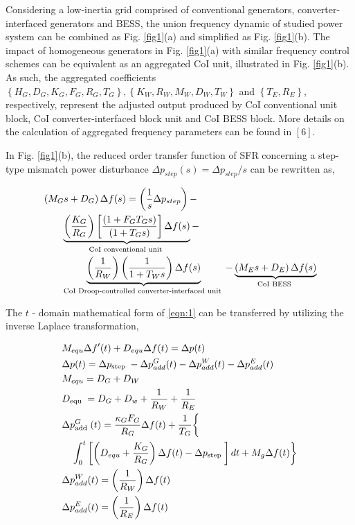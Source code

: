 \documentclass[lettersize,journal]{IEEEtran}
\begin{document}
Considering a low-inertia grid comprised of conventional generators, converter-interfaced generators and BESS, the union frequency dynamic of studied power system can be combined as Fig. \ref{fig1}(a) and simplified as Fig. \ref{fig1}(b). The impact of homogeneous generators in Fig. \ref{fig1}(a) with similar frequency control schemes can be equivalent as an aggregated $\mathrm{CoI}$ unit, illustrated in Fig. \ref{fig1}(b). As such, the aggregated coefficients $\left\{H_{G}, D_{G}, K_{G}, F_{G}, R_{G}, T_{G}\right\},\left\{K_{W}, R_{W}, M_{W}, D_{W}, T_{W}\right\}$ and $\left\{T_{E}, R_{E}\right\}$, respectively, represent the adjusted output produced by $\mathrm{CoI}$ conventional unit block, $\mathrm{CoI}$ converter-interfaced block unit and CoI BESS block. More details on the calculation of aggregated frequency parameters can be found in $[6]$. 

In Fig. \ref{fig1}(b), the reduced order transfer function of SFR concerning a step-type mismatch power disturbance $\Delta p_{{step }}(s)=\Delta p_{{step }} / s$ can be rewritten as,

\begin{align}\label{eqn:1}
& \left(M_{G} s+D_{G}\right) \Delta f(s)=\left(\frac{1}{s} \Delta p_{ {step }}\right)- \\
& \qquad\underbrace{\left(\frac{K_{G}}{ R_{G}}\right)\left[\frac{\left(1+F_{G} T_{G} s\right)}{\left(1+T_{G} s\right)}\right] \Delta f(s)}_{\text {CoI conventional unit }}- \notag\\
& \qquad\underbrace{\left(\frac{1}{R_{W}}\right)\left(\frac{1}{1+T_{W} s}\right) \Delta f(s)}_{\text {CoI Droop-controlled converter-interfaced unit }}-\underbrace{\left(M_{E} s+D_{E}\right) \Delta f(s)}_{\text {CoI BESS }} \notag
\end{align}

The $t$ - domain mathematical form of \eqref{eqn:1} can be transferred by utilizing the inverse Laplace transformation,

\begin{subequations}\label{eqn:2}
\begin{align}
& M_{e q u} \Delta f^{\prime}(t)+D_{e q u} \Delta f(t)=\Delta p(t) \\
& \Delta p(t)=\Delta p_{\text {step }}-\Delta p_{a d d}^{G}(t)-\Delta p_{a d d}^{W}(t)-\Delta p_{a d d}^{E}(t) \\
& M_{e q u}=D_{G}+D_{W} \\
& D_{\text {equ }}=D_{G}+D_{w}+\frac{1}{ R_{W}} +\frac{1}{ R_{E}} \\
& \Delta p_{\text {add }}^{G}(t)=\frac{\kappa_{G} F_{G}}{ R_{G}} \Delta f(t)+\frac{1}{ T_{G} }\biggl\{ \\
& \quad \int_{0}^{t}\left[\left(D_{e q u}+\frac{K_{G}}{ R_{G}}\right) \Delta f(t)-\Delta p_{\text {step }}\right] d t+M_{g} \Delta f(t)\biggr\} \notag\\
& \Delta p_{a d d}^{W}(t)=\left(\frac{1}{R_{W}}\right) \Delta f(t)\\ 
& \Delta p_{a d d}^{E}(t)=\left(\frac{1}{ R_{E}}\right) \Delta f(t)
\end{align}
\end{subequations}
\end{document}
